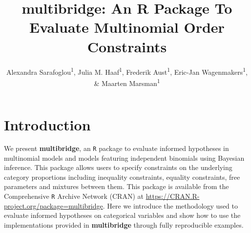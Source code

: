\documentclass[
  english,
  man,floatsintext]{apa6}
\title{multibridge: An R Package To Evaluate Multinomial Order Constraints}
\author{Alexandra Sarafoglou\textsuperscript{1}, Julia M. Haaf\textsuperscript{1}, Frederik Aust\textsuperscript{1}, Eric-Jan Wagenmakers\textsuperscript{1}, \& Maarten Marsman\textsuperscript{1}}
\date{}
\affiliation{\vspace{0.5cm}\textsuperscript{1} University of Amsterdam}
\begin{document}
\maketitle

\hypertarget{introduction}{%
\section{Introduction}\label{introduction}}

We present \textbf{multibridge}, an \texttt{R} package to evaluate informed hypotheses in multinomial models and models featuring independent binomials using Bayesian inference. This package allows users to specify constraints on the underlying category proportions including inequality constraints, equality constraints, free parameters and mixtures between them. This package is available from the Comprehensive \texttt{R} Archive Network (CRAN) at \url{https://CRAN.R-project.org/package=multibridge}. Here we introduce the methodology used to evaluate informed hypotheses on categorical variables and show how to use the implementations provided in \textbf{multibridge} through fully reproducible examples.
\end{document}

